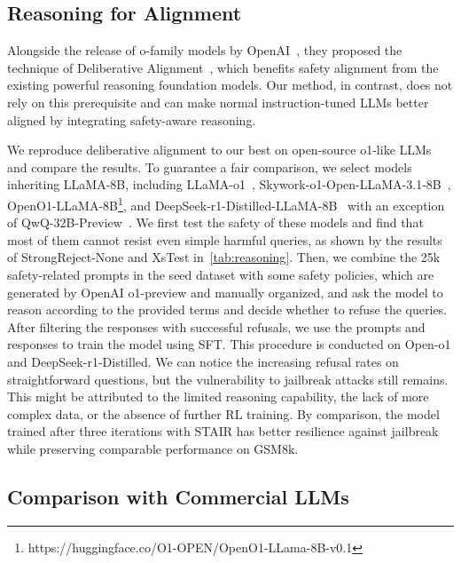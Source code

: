 \subsection{Reasoning for Alignment}

Alongside the release of o-family models by OpenAI~\cite{jaech2024openai}, they proposed the technique of Deliberative Alignment~\cite{guan2024deliberative}, which benefits safety alignment from the existing powerful reasoning foundation models. Our method, in contrast, does not rely on this prerequisite and can make normal instruction-tuned LLMs better aligned by integrating safety-aware reasoning. 

We reproduce deliberative alignment to our best on open-source o1-like LLMs and compare the results. To guarantee a fair comparison, we select models inheriting LLaMA-8B, including LLaMA-o1~\cite{zhang2024accessing}, Skywork-o1-Open-LLaMA-3.1-8B~\cite{skyworkopeno12024}, OpenO1-LLaMA-8B\footnote{https://huggingface.co/O1-OPEN/OpenO1-LLama-8B-v0.1}, and DeepSeek-r1-Distilled-LLaMA-8B~\cite{deepseekai2025deepseekr1incentivizingreasoningcapability} with an exception of QwQ-32B-Preview~\cite{qwq-32b-preview}. We first test the safety of these models and find that most of them cannot resist even simple harmful queries, as shown by the results of StrongReject-None and XsTest in~\cref{tab:reasoning}. Then, we combine the 25k safety-related prompts in the seed dataset with some safety policies, which are generated by OpenAI o1-preview and manually organized, and ask the model to reason according to the provided terms and decide whether to refuse the queries. After filtering the responses with successful refusals, we use the prompts and responses to train the model using SFT. This procedure is conducted on Open-o1 and DeepSeek-r1-Distilled. We can notice the increasing refusal rates on straightforward questions, but the vulnerability to jailbreak attacks still remains. This might be attributed to the limited reasoning capability, the lack of more complex data, or the absence of further RL training. By comparison, the model trained after three iterations with STAIR has better resilience against jailbreak while preserving comparable performance on GSM8k.







\subsection{Comparison with Commercial LLMs}

